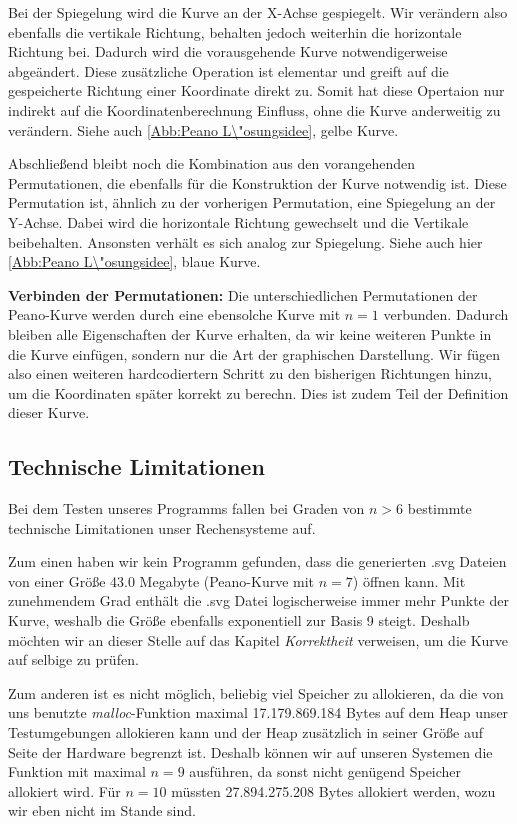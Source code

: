 \documentclass[course=asp]{aspdoc}
\begin{document}
Bei der Spiegelung wird die Kurve an der X-Achse gespiegelt. Wir ver\"andern also ebenfalls die vertikale Richtung, behalten jedoch weiterhin die horizontale Richtung bei. Dadurch wird die vorausgehende Kurve notwendigerweise abge\"andert. Diese zus\"atzliche Operation ist elementar und greift auf die gespeicherte Richtung einer Koordinate direkt zu. Somit hat diese Opertaion nur indirekt auf die Koordinatenberechnung Einfluss, ohne die Kurve anderweitig zu ver\"andern. Siehe auch \ref{Abb:Peano L\"osungsidee}, gelbe Kurve. %

Abschlie\ss end bleibt noch die Kombination aus den vorangehenden Permutationen, die ebenfalls f\"ur die Konstruktion der Kurve notwendig ist. Diese Permutation ist, \"ahnlich zu der vorherigen Permutation, eine Spiegelung an der Y-Achse. Dabei wird die horizontale Richtung gewechselt und die Vertikale beibehalten. Ansonsten verh\"alt es sich analog zur Spiegelung.
Siehe auch hier \ref{Abb:Peano L\"osungsidee}, blaue Kurve.

\textbf{Verbinden der Permutationen: }
Die unterschiedlichen Permutationen der Peano-Kurve werden durch eine ebensolche Kurve mit $n = 1$ verbunden. Dadurch bleiben alle Eigenschaften der Kurve erhalten, da wir keine weiteren Punkte in die Kurve einf\"ugen, sondern nur die Art der graphischen Darstellung. Wir f\"ugen also einen weiteren hardcodiertern Schritt zu den bisherigen Richtungen hinzu, um die Koordinaten sp\"ater korrekt zu berechn. Dies ist zudem Teil der Definition dieser Kurve.  


\subsection{Technische Limitationen} \label{Technische Limitationen} %
Bei dem Testen unseres Programms fallen bei Graden von $n > 6$ bestimmte technische Limitationen unser Rechensysteme auf. 

Zum einen haben wir kein Programm gefunden, dass die generierten .svg Dateien von einer Gr\"o\ss e 43.0 Megabyte (Peano-Kurve mit $n = 7$) \"offnen kann. Mit zunehmendem Grad enth\"alt die .svg Datei logischerweise immer mehr Punkte der Kurve, weshalb die Gr\"o\ss e ebenfalls exponentiell zur Basis 9 steigt. Deshalb m\"ochten wir an dieser Stelle auf das Kapitel \textit{Korrektheit} verweisen, um die Kurve auf selbige zu pr\"ufen.  %

Zum anderen ist es nicht m\"oglich, beliebig viel Speicher zu allokieren, da die von uns benutzte \textit{malloc}-Funktion maximal 17.179.869.184 Bytes auf dem Heap unser Testumgebungen allokieren kann und der Heap zus\"atzlich in seiner Gr\"o\ss e auf Seite der Hardware begrenzt ist. Deshalb k\"onnen wir auf unseren Systemen die Funktion mit maximal $n = 9$ ausf\"uhren, da sonst nicht gen\"ugend Speicher allokiert wird. F\"ur $n = 10$ m\"ussten 27.894.275.208 Bytes allokiert werden, wozu wir eben nicht im Stande sind. 
\end{document}
